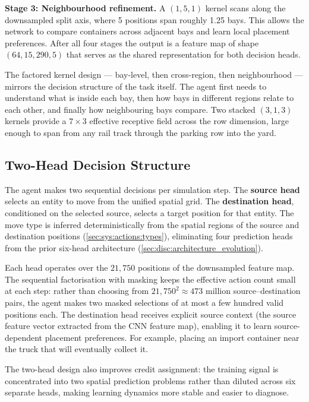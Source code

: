 \textbf{Stage 3: Neighbourhood refinement.} A $(1, 5, 1)$ kernel scans along the downsampled split axis, where 5 positions span roughly 1.25 bays. This allows the network to compare containers across adjacent bays and learn local placement preferences. After all four stages the output is a feature map of shape $(64, 15, 290, 5)$ that serves as the shared representation for both decision heads.

The factored kernel design --- bay-level, then cross-region, then neighbourhood --- mirrors the decision structure of the task itself. The agent first needs to understand what is inside each bay, then how bays in different regions relate to each other, and finally how neighbouring bays compare. Two stacked $(3, 1, 3)$ kernels provide a $7 \times 3$ effective receptive field across the row dimension, large enough to span from any rail track through the parking row into the yard.

\subsection{Two-Head Decision Structure}
\label{sec:agent:unified:heads}

The agent makes two sequential decisions per simulation step. The \textbf{source head} selects an entity to move from the unified spatial grid. The \textbf{destination head}, conditioned on the selected source, selects a target position for that entity. The move type is inferred deterministically from the spatial regions of the source and destination positions (\cref{sec:sys:actions:types}), eliminating four prediction heads from the prior six-head architecture (\cref{sec:disc:architecture_evolution}).

Each head operates over the $21{,}750$ positions of the downsampled feature map. The sequential factorisation with masking keeps the effective action count small at each step: rather than choosing from $21{,}750^2 \approx 473$ million source--destination pairs, the agent makes two masked selections of at most a few hundred valid positions each. The destination head receives explicit source context (the source feature vector extracted from the CNN feature map), enabling it to learn source-dependent placement preferences. For example, placing an import container near the truck that will eventually collect it.

The two-head design also improves credit assignment: the training signal is concentrated into two spatial prediction problems rather than diluted across six separate heads, making learning dynamics more stable and easier to diagnose.

